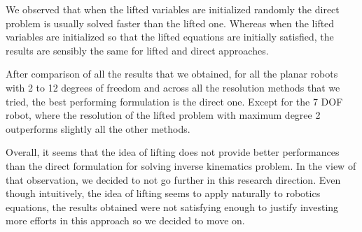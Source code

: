 We observed that when the lifted variables are initialized randomly the direct problem is usually solved faster than the lifted one.
Whereas when the lifted variables are initialized so that the lifted equations are initially satisfied, the results are sensibly the same for lifted and direct approaches.

After comparison of all the results that we obtained, for all the planar robots with 2 to 12 degrees of freedom and across all the resolution methods that we tried, the best performing formulation is the direct one. Except for the 7 DOF robot, where the resolution of the lifted problem with maximum degree 2 outperforms slightly all the other methods.

Overall, it seems that the idea of lifting does not provide better performances than the direct formulation for solving inverse kinematics problem.
In the view of that observation, we decided to not go further in this research direction.
Even though intuitively, the idea of lifting seems to apply naturally to robotics equations, the results obtained were not satisfying enough to justify investing more efforts in this approach so we decided to move on.

